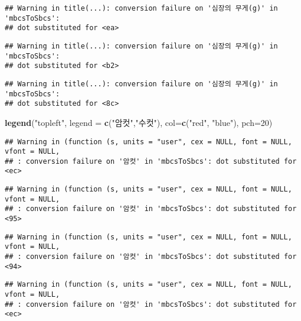 \documentclass[
]{article}
\newenvironment{Shaded}{\begin{snugshade}}{\end{snugshade}}
\newcommand{\AttributeTok}[1]{\textcolor[rgb]{0.13,0.29,0.53}{#1}}
\newcommand{\DecValTok}[1]{\textcolor[rgb]{0.00,0.00,0.81}{#1}}
\newcommand{\FunctionTok}[1]{\textcolor[rgb]{0.13,0.29,0.53}{\textbf{#1}}}
\newcommand{\NormalTok}[1]{#1}
\newcommand{\StringTok}[1]{\textcolor[rgb]{0.31,0.60,0.02}{#1}}
\begin{document}
\begin{verbatim}
## Warning in title(...): conversion failure on '심장의 무게(g)' in 'mbcsToSbcs':
## dot substituted for <ea>
\end{verbatim}

\begin{verbatim}
## Warning in title(...): conversion failure on '심장의 무게(g)' in 'mbcsToSbcs':
## dot substituted for <b2>
\end{verbatim}

\begin{verbatim}
## Warning in title(...): conversion failure on '심장의 무게(g)' in 'mbcsToSbcs':
## dot substituted for <8c>
\end{verbatim}

\begin{Shaded}
\begin{Highlighting}[]
\FunctionTok{legend}\NormalTok{(}\StringTok{"topleft"}\NormalTok{, }\AttributeTok{legend =} \FunctionTok{c}\NormalTok{(}\StringTok{"암컷"}\NormalTok{,}\StringTok{"수컷"}\NormalTok{), }\AttributeTok{col=}\FunctionTok{c}\NormalTok{(}\StringTok{"red"}\NormalTok{, }\StringTok{"blue"}\NormalTok{), }\AttributeTok{pch=}\DecValTok{20}\NormalTok{)}
\end{Highlighting}
\end{Shaded}

\begin{verbatim}
## Warning in (function (s, units = "user", cex = NULL, font = NULL, vfont = NULL,
## : conversion failure on '암컷' in 'mbcsToSbcs': dot substituted for <ec>
\end{verbatim}

\begin{verbatim}
## Warning in (function (s, units = "user", cex = NULL, font = NULL, vfont = NULL,
## : conversion failure on '암컷' in 'mbcsToSbcs': dot substituted for <95>
\end{verbatim}

\begin{verbatim}
## Warning in (function (s, units = "user", cex = NULL, font = NULL, vfont = NULL,
## : conversion failure on '암컷' in 'mbcsToSbcs': dot substituted for <94>
\end{verbatim}

\begin{verbatim}
## Warning in (function (s, units = "user", cex = NULL, font = NULL, vfont = NULL,
## : conversion failure on '암컷' in 'mbcsToSbcs': dot substituted for <ec>
\end{verbatim}
\end{document}
